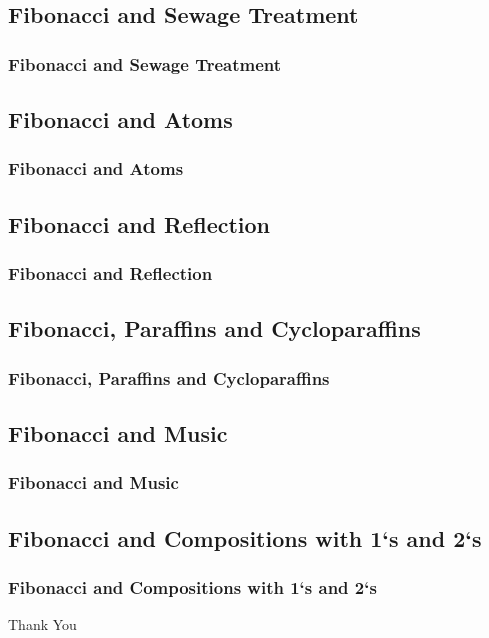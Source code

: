 \documentclass{beamer}
\begin{document}
\subsection{Fibonacci and Sewage Treatment}
\begin{frame}
\frametitle{Fibonacci and Sewage Treatment}
\end{frame}

\subsection{Fibonacci and Atoms}
\begin{frame}
\frametitle{Fibonacci and Atoms}
\end{frame}

\subsection{Fibonacci and Reflection}
\begin{frame}
\frametitle{Fibonacci and Reflection}
\end{frame}

\subsection{Fibonacci, Paraffins and Cycloparaffins}
\begin{frame}
\frametitle{Fibonacci, Paraffins and Cycloparaffins}
\end{frame}

\subsection{Fibonacci and Music}
\begin{frame}
\frametitle{Fibonacci and Music}
\end{frame}

\subsection{Fibonacci and Compositions with 1`s and 2`s}
\begin{frame}
\frametitle{Fibonacci and Compositions with 1`s and 2`s}
\end{frame}

\begin{frame}
	\vspace{0.6in}
	\hspace{3cm} {\color{blue}\Huge{Thank You}}
\end{frame}
\end{document}
